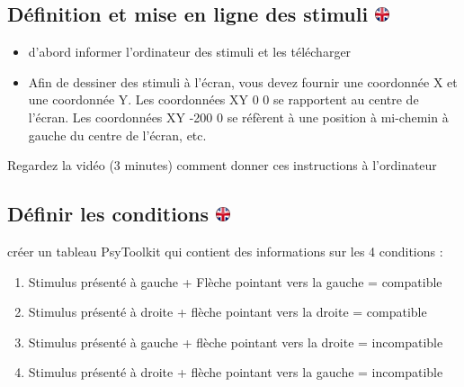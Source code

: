\documentclass[
]{book}
\providecommand{\tightlist}{%
  \setlength{\itemsep}{0pt}\setlength{\parskip}{0pt}}
\begin{document}
\hypertarget{duxe9finition-et-mise-en-ligne-des-stimuli}{%
\subsection[Définition et mise en ligne des stimuli ]{\texorpdfstring{Définition et mise en ligne des stimuli \href{https://www.psytoolkit.org/lessons/project.html\#_stimuli_definition_and_upload}{\protect\includegraphics{img/ukflag.png}}}{Définition et mise en ligne des stimuli }}\label{duxe9finition-et-mise-en-ligne-des-stimuli}}

\begin{itemize}
\tightlist
\item
  d'abord informer l'ordinateur des stimuli et les télécharger
\item
  Afin de dessiner des stimuli à l'écran, vous devez fournir une coordonnée X et une coordonnée Y. Les coordonnées XY 0 0 se rapportent au centre de l'écran. Les coordonnées XY -200 0 se réfèrent à une position à mi-chemin à gauche du centre de l'écran, etc.
\end{itemize}

Regardez la vidéo (3 minutes) comment donner ces instructions à l'ordinateur

\hypertarget{duxe9finir-les-conditions}{%
\subsection[Définir les conditions ]{\texorpdfstring{Définir les conditions \href{https://www.psytoolkit.org/lessons/project.html\#_defining_conditions}{\protect\includegraphics{img/ukflag.png}}}{Définir les conditions }}\label{duxe9finir-les-conditions}}

créer un tableau PsyToolkit qui contient des informations sur les 4 conditions :

\begin{enumerate}
\def\labelenumi{\arabic{enumi}.}
\tightlist
\item
  Stimulus présenté à gauche + Flèche pointant vers la gauche = compatible
\item
  Stimulus présenté à droite + flèche pointant vers la droite = compatible
\item
  Stimulus présenté à gauche + flèche pointant vers la droite = incompatible
\item
  Stimulus présenté à droite + flèche pointant vers la gauche = incompatible
\end{enumerate}
\end{document}
